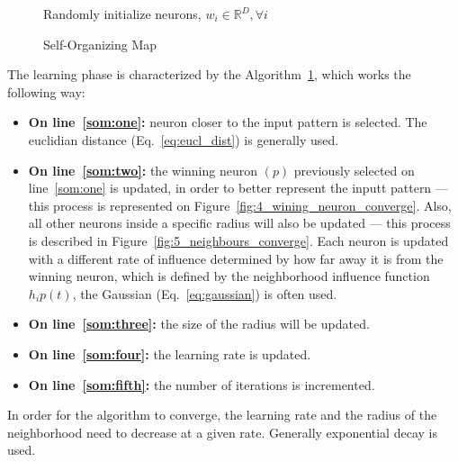 \begin{figure}[h]
  \begin{algorithm}[H]
    \label{alg:som}
    \DontPrintSemicolon
    Randomly initialize neurons, $w_i \in \mathbb{R}^{D}, \forall i $ \;
      \caption{Self-Organizing Map \cite[]{Kohonen1990} }
  \end{algorithm}
\end{figure}

The learning phase is characterized by the Algorithm~\ref{alg:som}, which works the following way:
\begin{itemize}
  \item \textbf{On line~\ref{som:one}:} neuron closer to the input pattern is selected. The euclidian distance (Eq.~\ref{eq:eucl_dist}) is generally used.
    
  \item \textbf{On line~\ref{som:two}:} the winning neuron $(p)$ previously selected on line~\ref{som:one} is updated, in order to better represent the inputt pattern --- this process is represented on Figure~\ref{fig:4_wining_neuron_converge}. Also, all other neurons inside a specific radius will also be updated --- this process is described in Figure~\ref{fig:5_neighbours_converge}. Each neuron is updated with a different rate of influence determined by how far away it is from the winning neuron, which is defined by the neighborhood influence function $h_ip(t)$, the Gaussian (Eq.~\ref{eq:gaussian}) is often used. 
    
  \item \textbf{On line~\ref{som:three}:} the size of the radius will be updated.
  \item \textbf{On line~\ref{som:four}:} the learning rate is updated.
  \item \textbf{On line~\ref{som:fifth}:} the number of iterations is incremented.
\end{itemize}
 
In order for the algorithm to converge, the learning rate and the radius of the neighborhood need to decrease at a given rate. Generally exponential decay is used.
